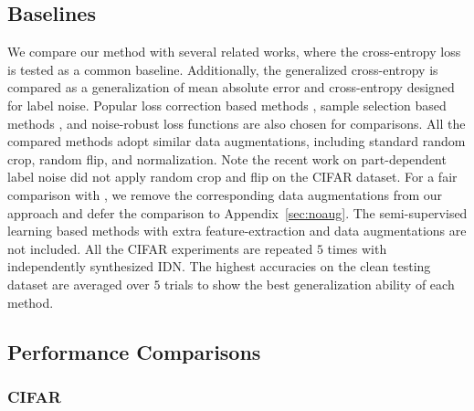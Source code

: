 \documentclass[final]{cvpr}
\newcommand{\rev}[1]{{\color{blue}#1}}
\newcommand{\rev}[1]{#1}
\begin{document}
\subsection{Baselines}
We compare our method with several related works, where the cross-entropy loss is tested as a common baseline.
Additionally, the generalized cross-entropy \cite{zhang2018generalized} is compared as a generalization of mean absolute error and cross-entropy designed for label noise.
Popular loss correction based methods \cite{patrini2017making,xia2020parts,xia2019anchor}, sample selection based methods \cite{sieve2020,han2018co,wei2020combating,yu2019does}, and noise-robust loss functions \cite{liu2019peer,xu2019l_dmi} are also chosen for comparisons.
All the compared methods adopt similar data augmentations, including standard random crop, random flip, and normalization.
Note the recent work on part-dependent label noise \cite{xia2020parts} did not apply random crop and flip on the CIFAR dataset.
For a fair comparison with \cite{xia2020parts}, we remove the corresponding data augmentations from our approach and defer the comparison to Appendix~\ref{sec:noaug}.
The semi-supervised learning based methods with extra feature-extraction and data augmentations are not included.
\rev{All the CIFAR experiments are repeated $5$ times with independently synthesized IDN.}
The highest accuracies on the clean testing dataset are \rev{averaged over $5$ trials to show the best generalization ability of each method.}




\subsection{Performance Comparisons}
\subsubsection{CIFAR}
\end{document}
